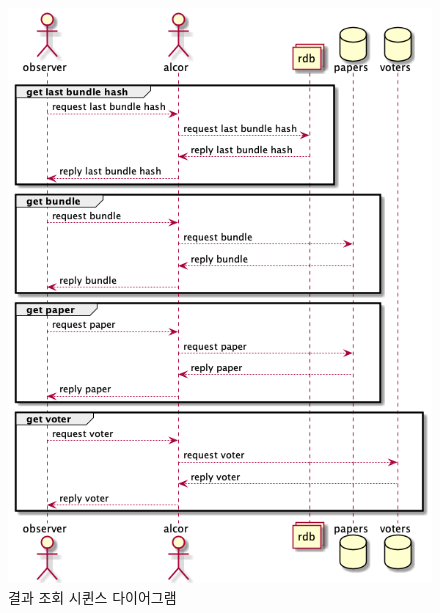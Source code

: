 \documentclass[8pt,a4paper,left=8mm,right=8mm,top=10mm,bottom=10mm]{article}
\begin{document}
    \begin{figure}[h]
        \begin{center}
            \includegraphics[width=13cm]{observer-get.png}
            \caption{결과 조회 시퀸스 다이어그램}
        \end{center}
    \end{figure}
\end{document}
